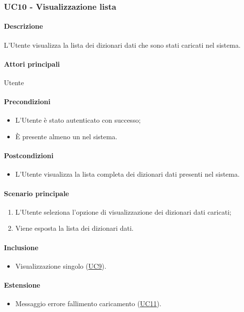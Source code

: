 \subsubsection{UC10 - Visualizzazione lista }\label{UC10}
\paragraph*{Descrizione}
L’Utente visualizza la lista dei dizionari dati che sono stati caricati nel sistema.

\paragraph*{Attori principali}
Utente

\paragraph*{Precondizioni}
\begin{itemize}
  \item L’Utente è stato autenticato con successo;
  \item È presente almeno un  nel sistema.
\end{itemize}

\paragraph*{Postcondizioni}
\begin{itemize}
  \item L’Utente visualizza la lista completa dei dizionari dati presenti nel sistema.
\end{itemize}

\paragraph*{Scenario principale}
\begin{enumerate}
  \item L’Utente seleziona l’opzione di visualizzazione dei dizionari dati caricati;
  \item Viene esposta la lista dei dizionari dati.
\end{enumerate}

\paragraph*{Inclusione}
\begin{itemize}
  \item Visualizzazione singolo  (\hyperref[UC9]{UC9}).
\end{itemize}

\paragraph*{Estensione}
\begin{itemize}
  \item Messaggio errore fallimento caricamento (\hyperref[UC11]{UC11}).
\end{itemize}
